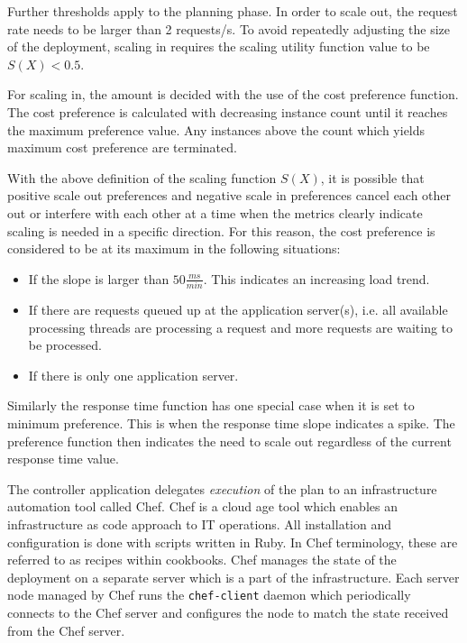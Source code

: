 \documentclass[english]{tktltiki2}
\theoremstyle{definition}
\theoremstyle{remark}
\begin{document}
Further thresholds apply to the planning phase. In order to scale out, the
request rate needs to be larger than 2 requests/s. To avoid repeatedly adjusting
the size of the deployment, scaling in requires the scaling utility function
value to be $S(X) < 0.5$.

For scaling in, the amount is decided with the use of the cost preference
function. The cost preference is calculated with decreasing instance count until
it reaches the maximum preference value. Any instances above the count which
yields maximum cost preference are terminated.

With the above definition of the scaling function $S(X)$, it is possible that
positive scale out preferences and negative scale in preferences cancel each
other out or interfere with each other at a time when the metrics clearly indicate scaling is needed in a specific direction. For this reason, the cost preference is considered to be at its maximum in the following situations:

\begin{itemize}
	\item{If the slope is larger than $50 \frac{ms}{min}$. This indicates an increasing load trend.}
	\item{If there are requests queued up at the application server(s), i.e. all available processing threads are processing a request and more requests are waiting to be processed.}
	\item{If there is only one application server.}
\end{itemize}

Similarly the response time function has one special case when it is set to minimum preference. This is when the response time slope indicates a spike. The preference function then indicates the need to scale out regardless of the current response time value.

The controller application delegates \textit{execution} of the plan to an
infrastructure automation tool called Chef. Chef is a cloud age tool which
enables an infrastructure as code approach to IT operations. All installation
and configuration is done with scripts written in Ruby. In Chef terminology,
these are referred to as recipes within cookbooks. Chef manages the state of the
deployment on a separate server which is a part of the infrastructure. Each
server node managed by Chef runs the \texttt{chef-client} daemon which
periodically connects to the Chef server and configures the node to match the
state received from the Chef server.
\end{document}

